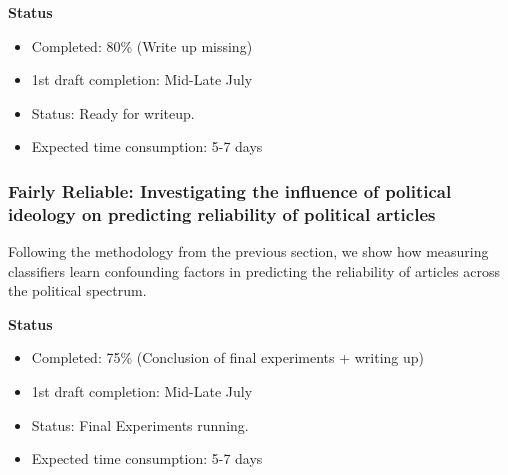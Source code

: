 {\textbf{Status}
\begin{itemize}
    \item Completed: 80\% (Write up missing)
    \item 1st draft completion: Mid-Late July
    \item Status: Ready for writeup.
    \item Expected time consumption: 5-7 days
\end{itemize}

\subsubsection{Fairly Reliable: Investigating the influence of political ideology on predicting reliability of political articles}
Following the methodology from the previous section, we show how measuring classifiers learn confounding factors in predicting the reliability of articles across the political spectrum.

\textbf{Status}
\begin{itemize}
    \item Completed: 75\% (Conclusion of final experiments + writing up)
    \item 1st draft completion: Mid-Late July
    \item Status: Final Experiments running.
    \item Expected time consumption: 5-7 days
\end{itemize}



}
